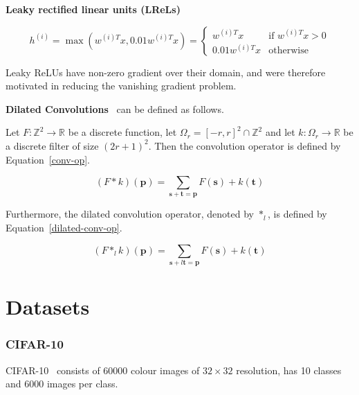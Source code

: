 \documentclass[a4paper, 12pt]{article}
\newcommand\phantomlabel[1]{\phantomsection\label{#1}}
\begin{document}
\textbf{Leaky rectified linear units (LReLs)}\cite{maas_rectified_nonlinearities}

\begin{equation}
        h^{(i)} = \max\left(w^{(i)T}x, 0.01w^{(i)T}x\right) =
        \begin{cases}
                w^{(i)T}x & \textrm{if } w^{(i)T}x > 0 \\
                0.01w^{(i)T}x & \textrm{otherwise}
        \end{cases}
\end{equation}

Leaky ReLUs have non-zero gradient over their domain, and were therefore
motivated in reducing the vanishing gradient problem.


\phantomlabel{dilated_convolutions}
\textbf{Dilated Convolutions}~\cite{DBLP:journals/corr/YuK15} can be defined as
follows.

Let $F: \mathbb{Z}^2 \rightarrow \mathbb{R}$ be a discrete
function, let $\Omega_r = {[-r, r]}^2 \cap \mathbb{Z}^2$ and let
$k: \Omega_r \rightarrow \mathbb{R}$ be a discrete filter of size
${(2r + 1)}^2$. Then the convolution operator is defined by
Equation~\ref{conv-op}.

\begin{equation}
        (F * k)(\mathbf{p}) = \sum_{\mathbf{s} + \mathbf{t} = \mathbf{p}} F(\mathbf{s}) + k(\mathbf{t})
        \label{conv-op}
\end{equation}

Furthermore, the dilated convolution operator, denoted by $*_l$, is defined by
Equation~\ref{dilated-conv-op}.

\begin{equation}
        (F *_l k)(\mathbf{p}) = \sum_{\mathbf{s} + l\mathbf{t} = \mathbf{p}} F(\mathbf{s}) + k(\mathbf{t})
        \label{dilated-conv-op}
\end{equation}


\part{Datasets}

\section{CIFAR-10~\cite{cifar10-website}}
\label{cifar10}

CIFAR-10~\cite{cifar10-website} consists of \num{60000} colour images of $32
\times 32$ resolution, has 10 classes and \num{6000} images per class.
\end{document}
